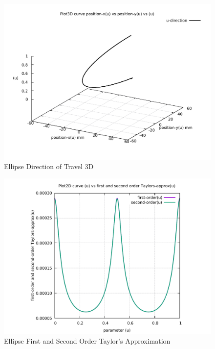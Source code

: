 \begin{figure}
	\caption     {Ellipse Direction of Travel 3D}
	\label{04-img-Ellipse Direction of Travel 3D.pdf}
	\includegraphics[width=1.00\textwidth]{Chap4/appendix/app-Ellipse/plots/04-img-Ellipse Direction of Travel 3D.pdf}
\end{figure}

\clearpage
\pagebreak

\begin{figure}
	\caption     {Ellipse First and Second Order Taylor's Approximation}
	\label{05-img-Ellipse-First-and-Second-Order-Taylors-Approx.pdf}
	\includegraphics[width=1.00\textwidth]{Chap4/appendix/app-Ellipse/plots/05-img-Ellipse-First-and-Second-Order-Taylors-Approx.pdf}
\end{figure}


